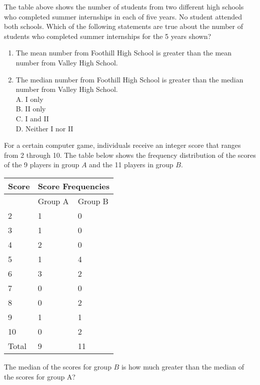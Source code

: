 The table above shows the number of students from two different high schools who completed summer internships in each of five years. No student attended both schools. Which of the following statements are true about the number of students who completed summer internships for the 5 years shown?

\begin{enumerate}
  \item The mean number from Foothill High School is greater than the mean number from Valley High School.
  \item The median number from Foothill High School is greater than the median number from Valley High School.\\
A. I only\\
B. II only\\
C. I and II\\
D. Neither I nor II
\end{enumerate}

For a certain computer game, individuals receive an integer score that ranges from 2 through 10. The table below shows the frequency distribution of the scores of the 9 players in group $A$ and the 11 players in group $B$.

\begin{center}
\begin{tabular}{|l|l|l|}
\hline
\multirow{2}{*}{Score} & \multicolumn{2}{|c|}{Score Frequencies} \\
\hline
 & Group A & Group B \\
\hline
2 & 1 & 0 \\
\hline
3 & 1 & 0 \\
\hline
4 & 2 & 0 \\
\hline
5 & 1 & 4 \\
\hline
6 & 3 & 2 \\
\hline
7 & 0 & 0 \\
\hline
8 & 0 & 2 \\
\hline
9 & 1 & 1 \\
\hline
10 & 0 & 2 \\
\hline
Total & 9 & 11 \\
\hline
\end{tabular}
\end{center}

The median of the scores for group $B$ is how much greater than the median of the scores for group A?



